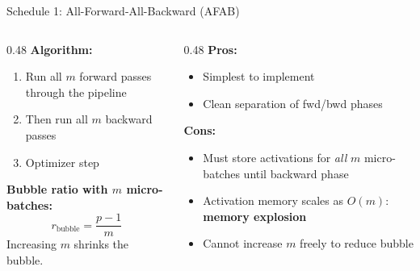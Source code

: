 \begin{frame}{Schedule 1: All-Forward-All-Backward (AFAB)}
  \vspace{0.2em}
  \begin{columns}
    \begin{column}{0.48\textwidth}
      \textbf{Algorithm:}
      \begin{enumerate}
        \item Run all $m$ forward passes through the pipeline
        \item Then run all $m$ backward passes
        \item Optimizer step
      \end{enumerate}

      \vspace{0.3em}
      \textbf{Bubble ratio with $m$ micro-batches:}
      \[
        r_{\text{bubble}} = \frac{p - 1}{m}
      \]
      Increasing $m$ shrinks the bubble.
    \end{column}
    \begin{column}{0.48\textwidth}
      \textbf{Pros:}
      \begin{itemize}
        \item Simplest to implement
        \item Clean separation of fwd/bwd phases
      \end{itemize}

      \vspace{0.3em}
      \textbf{Cons:}
      \begin{itemize}
        \item Must store activations for \emph{all} $m$ micro-batches until backward phase
        \item Activation memory scales as $O(m)$: \textbf{memory explosion}
        \item Cannot increase $m$ freely to reduce bubble
      \end{itemize}
    \end{column}
  \end{columns}
\end{frame}

